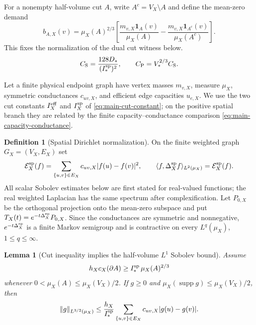 \documentclass[11pt]{article}
\numberwithin{equation}{section}
\newtheorem{lemma}[lemma]{Lemma}
\theoremstyle{definition}
\newtheorem{definition}[definition]{Definition}
\theoremstyle{remark}
\newcommand{\one}{\mathbf 1}
\newcommand{\supp}{\operatorname{supp}}
\begin{document}
For a nonempty half-volume cut $A$, write $A^c=V_X\setminus A$ and define
the mean-zero demand
\begin{equation}
 b_{A,X}(v)=\mu_X(A)^{2/3}
 \left[\frac{m_{v,X}\one_A(v)}{\mu_X(A)}
       -\frac{m_{v,X}\one_{A^c}(v)}{\mu_X(A^c)}\right].
 \label{eq:main-cut-demand}
\end{equation}
This fixes the normalization of the dual cut witness below.
\begin{equation}
 C_{\rm S}=\frac{128D_*}{(I_*^{\rm sp})^2},
 \qquad
 C_{\rm P}=V_*^{2/3}C_{\rm S}.
 \label{eq:main-sobolev-constants}
\end{equation}

Let a finite physical endpoint graph have vertex masses $m_{v,X}$, measure
$\mu_X$, symmetric conductances $c_{uv,X}$, and efficient edge capacities
$u_{e,X}$.  We use the two cut constants $I_X^{\rm eff}$ and
$I_X^{\rm sp}$ of \eqref{eq:main-cut-constant}; on the positive spatial branch
they are related by the finite capacity--conductance comparison
\eqref{eq:main-capacity-conductance}.

\begin{definition}[Spatial Dirichlet normalization]
\label{def:supp-spatial-dirichlet}
On the finite weighted graph $G_X=(V_X,E_X)$ set
\begin{equation}
 \mathcal E_X^{\rm sp}(f)
 =\sum_{\{u,v\}\in E_X}c_{uv,X}|f(u)-f(v)|^2,
 \qquad
 \langle f,\Delta_X^{\rm sp}f\rangle_{L^2(\mu_X)}
 =\mathcal E_X^{\rm sp}(f).
 \label{eq:supp-spatial-dirichlet}
\end{equation}
All scalar Sobolev estimates below are first stated for real-valued functions;
the real weighted Laplacian has the same spectrum after complexification.  Let
$P_{0,X}$ be the orthogonal projection onto the mean-zero subspace and put
$T_X(t)=e^{-t\Delta_X^{\rm sp}}P_{0,X}$.  Since the conductances are symmetric
and nonnegative, $e^{-t\Delta_X^{\rm sp}}$ is a finite Markov semigroup and is
contractive on every $L^q(\mu_X)$, $1\le q\le\infty$.
\end{definition}

\begin{lemma}[Cut inequality implies the half-volume $L^1$ Sobolev bound]
\label{lem:supp-half-volume-sobolev}
Assume
\begin{equation}
 h_Xc_X(\partial A)\ge I_*^{\rm sp}\,\mu_X(A)^{2/3}
 \label{eq:supp-cut-isoperimetry}
\end{equation}
whenever $0<\mu_X(A)\le\mu_X(V_X)/2$.  If $g\ge0$ and
$\mu_X(\supp g)\le\mu_X(V_X)/2$, then
\begin{equation}
 \|g\|_{L^{3/2}(\mu_X)}
 \le \frac{h_X}{I_*^{\rm sp}}
 \sum_{\{u,v\}\in E_X}c_{uv,X}|g(u)-g(v)|.
 \label{eq:supp-l1-sobolev}
\end{equation}
\end{lemma}
\end{document}
